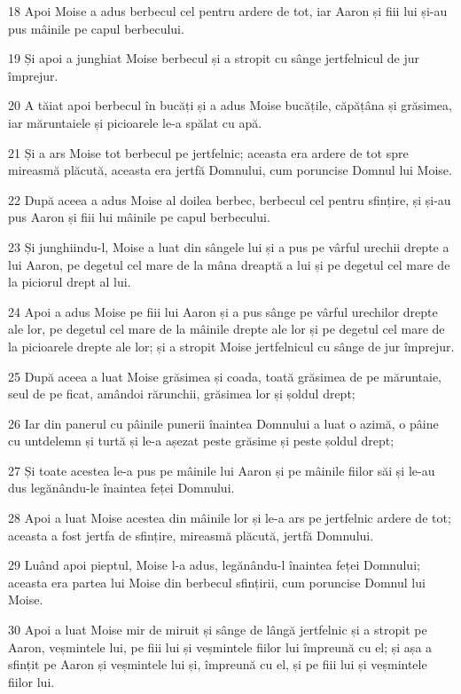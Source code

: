 \par 18 Apoi Moise a adus berbecul cel pentru ardere de tot, iar Aaron și fiii lui și-au pus mâinile pe capul berbecului.
\par 19 Și apoi a junghiat Moise berbecul și a stropit cu sânge jertfelnicul de jur împrejur.
\par 20 A tăiat apoi berbecul în bucăți și a adus Moise bucățile, căpățâna și grăsimea, iar măruntaiele și picioarele le-a spălat cu apă.
\par 21 Și a ars Moise tot berbecul pe jertfelnic; aceasta era ardere de tot spre mireasmă plăcută, aceasta era jertfă Domnului, cum poruncise Domnul lui Moise.
\par 22 După aceea a adus Moise al doilea berbec, berbecul cel pentru sfințire, și și-au pus Aaron și fiii lui mâinile pe capul berbecului.
\par 23 Și junghiindu-l, Moise a luat din sângele lui și a pus pe vârful urechii drepte a lui Aaron, pe degetul cel mare de la mâna dreaptă a lui și pe degetul cel mare de la piciorul drept al lui.
\par 24 Apoi a adus Moise pe fiii lui Aaron și a pus sânge pe vârful urechilor drepte ale lor, pe degetul cel mare de la mâinile drepte ale lor și pe degetul cel mare de la picioarele drepte ale lor; și a stropit Moise jertfelnicul cu sânge de jur împrejur.
\par 25 După aceea a luat Moise grăsimea și coada, toată grăsimea de pe măruntaie, seul de pe ficat, amândoi rărunchii, grăsimea lor și șoldul drept;
\par 26 Iar din panerul cu pâinile punerii înaintea Domnului a luat o azimă, o pâine cu untdelemn și turtă și le-a așezat peste grăsime și peste șoldul drept;
\par 27 Și toate acestea le-a pus pe mâinile lui Aaron și pe mâinile fiilor săi și le-au dus legănându-le înaintea feței Domnului.
\par 28 Apoi a luat Moise acestea din mâinile lor și le-a ars pe jertfelnic ardere de tot; aceasta a fost jertfa de sfințire, mireasmă plăcută, jertfă Domnului.
\par 29 Luând apoi pieptul, Moise l-a adus, legănându-l înaintea feței Domnului; aceasta era partea lui Moise din berbecul sfințirii, cum poruncise Domnul lui Moise.
\par 30 Apoi a luat Moise mir de miruit și sânge de lângă jertfelnic și a stropit pe Aaron, veșmintele lui, pe fiii lui și veșmintele fiilor lui împreună cu el; și așa a sfințit pe Aaron și veșmintele lui și, împreună cu el, și pe fiii lui și veșmintele fiilor lui.
